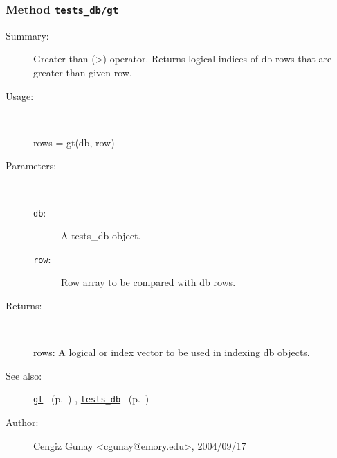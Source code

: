 \subsubsection[Method \texttt{gt}]{Method \texttt{tests\_db/gt}}%
%
\label{ref_tests_db__gt}%
\hypertarget{ref_tests_db__gt}{}%
\begin{description}
\item[Summary:]Greater than (>) operator. Returns logical indices of db rows 
	that are greater than given row.
%
\item[Usage:]~%
\begin{lyxcode}%
rows = gt(db, row)
%
\end{lyxcode}%
%
%
\item[Parameters:]~
\begin{description}%
\item[\texttt{db}:]
 A tests\_db object.
\item[\texttt{row}:]
 Row array to be compared with db rows.
\end{description}%
%
\item[Returns:
]~

	rows: A logical or index vector to be used in indexing db objects. 
%
%
\item[See also:]%
\hyperlink{ref_gt}{\texttt{gt}}%
\ (p.~\pageref{ref_gt})%
%
, \hyperlink{ref_tests_db}{\texttt{tests\_db}}%
\ (p.~\pageref{ref_tests_db})%
%
%
\item[Author:]%
Cengiz Gunay <cgunay@emory.edu>, 2004/09/17
%
\end{description}
\methodline%
